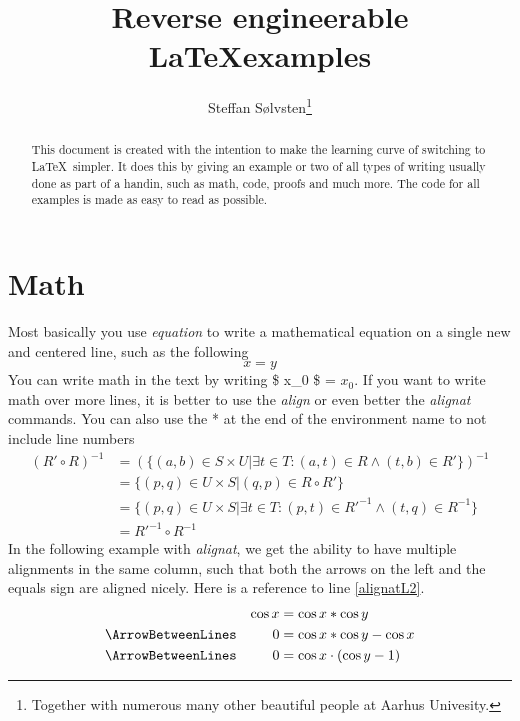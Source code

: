 \documentclass[english]{article}
\title{{\LARGE Reverse engineerable \LaTeX examples}}
\author{Steffan Sølvsten\footnote{Together with numerous many other beautiful
    people at Aarhus Univesity.}}
\affil{Aarhus University \\ \mailto{soelvsten@cs.au.dk}}
\begin{document}
\maketitle

\begin{abstract}
  This document is created with the intention to make the learning curve of
  switching to \LaTeX\ simpler. It does this by giving an example or two of all
  types of writing usually done as part of a handin, such as math, code, proofs
  and much more. The code for all examples is made as easy to read as possible.
\end{abstract}

\newpage
\tableofcontents

\newpage
\section{Math} \label{sec:math}
Most basically you use \emph{equation} to write a mathematical equation on a
single new and centered line, such as the following
\begin{equation}
  x = y
\end{equation}
You can write math in the text by writing \$ x\_0 \$ = $x_0$. If you want to
write math over more lines, it is better to use the \emph{align} or even better
the \emph{alignat} commands. You can also use the * at the end of the
environment name to not include line numbers
\begin{align*}
  (R' \circ R)^{-1}
    &= (\{(a,b) \in S \times U | \exists t \in T: (a,t) \in R \wedge (t,b) \in R'\})^{-1}
\\
    &= \{(p,q) \in U \times S | (q,p) \in R \circ R' \}
\\
    &= \{(p,q) \in U \times S | \exists t \in T : (p,t) \in R'^{-1} \wedge (t,q) \in R^{-1}\}
\\
    &= R'^{-1} \circ R^{-1}
\end{align*}
In the following example with \emph{alignat}, we get the ability to have
multiple alignments in the same column, such that both the arrows on the left
and the equals sign are aligned nicely. Here is a reference to line
\ref{alignatL2}.
\begin{alignat}{2}
    && \cos x &= \cos x * \cos y \label{alignatL1}
\\ \ArrowBetweenLines
    && 0 &= \cos x * \cos y - \cos x \label{alignatL2}
\\ \ArrowBetweenLines
    && 0 &= \cos x \cdot (\cos y - 1) \label{alignatL3}
\end{alignat}
\end{document}
